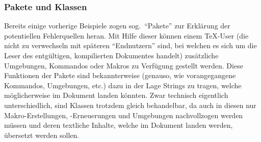 \subsubsection{Pakete und Klassen}\par
Bereits einige vorherige Beispiele zogen sog.\ \enquote{Pakete} zur Erklärung der potentiellen Fehlerquellen heran. Mit Hilfe dieser können einem \TeX{}-User (die nicht zu verwechseln mit späteren \enquote{Endnutzern} sind, bei welchen es sich um die Leser des entgültigen, kompilierten Dokumentes handelt) zusätzliche Umgebungen, Kommandos oder Makros zu Verfügung gestellt werden. Diese Funktionen der Pakete sind bekannterweise (genauso, wie vorangegangene Kommandos, Umgebungen, etc.) dazu in der Lage Strings zu tragen, welche möglicherweise im Dokument landen könnten. Zwar technisch eigentlich unterschiedlich, sind Klassen trotzdem gleich behandelbar, da auch in diesen nur Makro-Erstellungen, -Erneuerungen und Umgebungen nachvollzogen werden müssen und deren textliche Inhalte, welche im Dokument landen werden, übersetzt werden sollen.%



